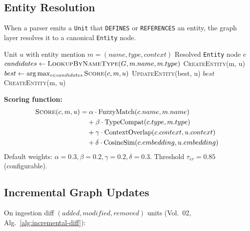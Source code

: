 \subsection{Entity Resolution}
\label{sec:kg:entity-resolution}

When a parser emits a \texttt{Unit} that \texttt{DEFINES} or \texttt{REFERENCES} an entity, the graph layer resolves it to a canonical \texttt{Entity} node.

\begin{algorithm}[H]
\caption{Entity Resolution}
\label{alg:entity-resolution}
\begin{algorithmic}[1]
\Require Unit $u$ with entity mention $m = (name, type, context)$
\Ensure Resolved \texttt{Entity} node $e$
\State $candidates \gets \textsc{LookupByNameType}(G, m.name, m.type)$
  \State \Return \textsc{CreateEntity}(m, u)
\EndIf
\State $best \gets \arg\max_{c \in candidates} \textsc{Score}(c, m, u)$
  \State \textsc{UpdateEntity}(best, u) 
  \State \Return $best$
\Else
  \State \Return \textsc{CreateEntity}(m, u) 
\EndIf
\end{algorithmic}
\end{algorithm}

\textbf{Scoring function:}
\begin{align*}
\textsc{Score}(c, m, u) = &\; \alpha \cdot \text{FuzzyMatch}(c.name, m.name) \\
&+ \beta \cdot \text{TypeCompat}(c.type, m.type) \\
&+ \gamma \cdot \text{ContextOverlap}(c.context, u.context) \\
&+ \delta \cdot \text{CosineSim}(c.embedding, u.embedding)
\end{align*}
Default weights: $\alpha=0.3, \beta=0.2, \gamma=0.2, \delta=0.3$. Threshold $\tau_{er}=0.85$ (configurable).

\subsection{Incremental Graph Updates}
\label{sec:kg:incremental}

On ingestion diff $(added, modified, removed)$ units (Vol.~02, Alg.~\ref{alg:incremental-diff}):

